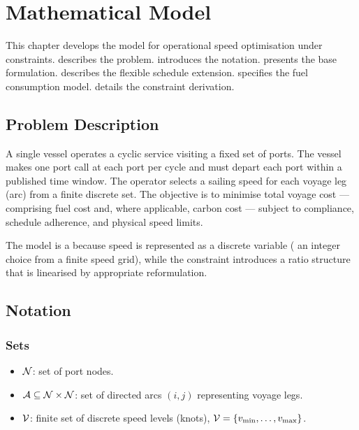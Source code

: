 \section{Mathematical Model}
\label{ch:model}

This chapter develops the \MILP{} model for operational speed
optimisation under \CII{} constraints.  describes
the problem.  introduces the notation.
 presents the base formulation.
 describes the flexible schedule extension.
 specifies the fuel consumption model.
 details the \CII{} constraint derivation.

\subsection{Problem Description}
\label{sec:model:problem}

A single \RoRo{} vessel operates a cyclic service visiting a fixed set of
ports. The vessel makes one port call at each port per cycle and must
depart each port within a published time window. The operator selects a
sailing speed for each voyage leg (arc) from a finite discrete set. The
objective is to minimise total voyage cost --- comprising fuel cost and,
where applicable, \ETS{} carbon cost --- subject to \CII{} compliance,
schedule adherence, and physical speed limits.

The model is a \MILP{} because speed is represented as a discrete
variable (\ie{} an integer choice from a finite speed grid), while the
\CII{} constraint introduces a ratio structure that is linearised by
appropriate reformulation.

\subsection{Notation}
\label{sec:model:notation}

\subsubsection{Sets}
\label{sec:model:sets}

\begin{itemize}
  \item $\mathcal{N}$: set of port nodes.
  \item $\mathcal{A} \subseteq \mathcal{N} \times \mathcal{N}$: set of directed arcs
    $(i,j)$ representing voyage legs.
  \item $\mathcal{V}$: finite set of discrete speed levels (knots),
    $\mathcal{V} = \{v_{\min}, \ldots, v_{\max}\}$.
\end{itemize}

